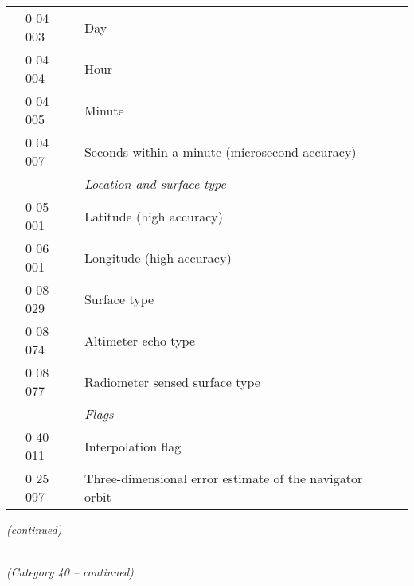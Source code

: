\begin{longtable}[]{@{}llll@{}}
& 0 04 003 & Day &\tabularnewline
& 0 04 004 & Hour &\tabularnewline
& 0 04 005 & Minute &\tabularnewline
& 0 04 007 & Seconds within a minute (microsecond accuracy) &\tabularnewline
& & \emph{Location and surface type} &\tabularnewline
& 0 05 001 & Latitude (high accuracy) &\tabularnewline
& 0 06 001 & Longitude (high accuracy) &\tabularnewline
& 0 08 029 & Surface type &\tabularnewline
& 0 08 074 & Altimeter echo type &\tabularnewline
& 0 08 077 & Radiometer sensed surface type &\tabularnewline
& & \emph{Flags} &\tabularnewline
& 0 40 011 & Interpolation flag &\tabularnewline
& 0 25 097 & Three-dimensional error estimate of the navigator orbit &\tabularnewline
\bottomrule
\end{longtable}

\emph{(continued)}

\emph{\\
(Category 40 -- continued)}

